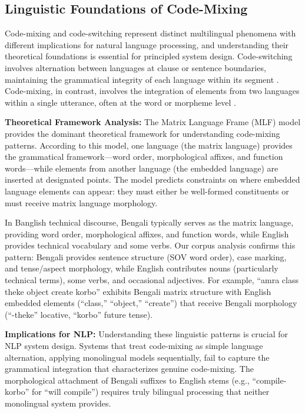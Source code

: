 \subsection{Linguistic Foundations of Code-Mixing}

Code-mixing and code-switching represent distinct multilingual phenomena with different implications for natural language processing, and understanding their theoretical foundations is essential for principled system design. Code-switching involves alternation between languages at clause or sentence boundaries, maintaining the grammatical integrity of each language within its segment \cite{MyersScotton1993}. Code-mixing, in contrast, involves the integration of elements from two languages within a single utterance, often at the word or morpheme level \cite{Muysken2000}.

\textbf{Theoretical Framework Analysis:} The Matrix Language Frame (MLF) model \cite{MyersScotton1997} provides the dominant theoretical framework for understanding code-mixing patterns. According to this model, one language (the matrix language) provides the grammatical framework---word order, morphological affixes, and function words---while elements from another language (the embedded language) are inserted at designated points. The model predicts constraints on where embedded language elements can appear: they must either be well-formed constituents or must receive matrix language morphology.

In Banglish technical discourse, Bengali typically serves as the matrix language, providing word order, morphological affixes, and function words, while English provides technical vocabulary and some verbs. Our corpus analysis confirms this pattern: Bengali provides sentence structure (SOV word order), case marking, and tense/aspect morphology, while English contributes nouns (particularly technical terms), some verbs, and occasional adjectives. For example, ``amra class theke object create korbo'' exhibits Bengali matrix structure with English embedded elements (``class,'' ``object,'' ``create'') that receive Bengali morphology (``-theke'' locative, ``korbo'' future tense).

\textbf{Implications for NLP:} Understanding these linguistic patterns is crucial for NLP system design. Systems that treat code-mixing as simple language alternation, applying monolingual models sequentially, fail to capture the grammatical integration that characterizes genuine code-mixing. The morphological attachment of Bengali suffixes to English stems (e.g., ``compile-korbo'' for ``will compile'') requires truly bilingual processing that neither monolingual system provides.


